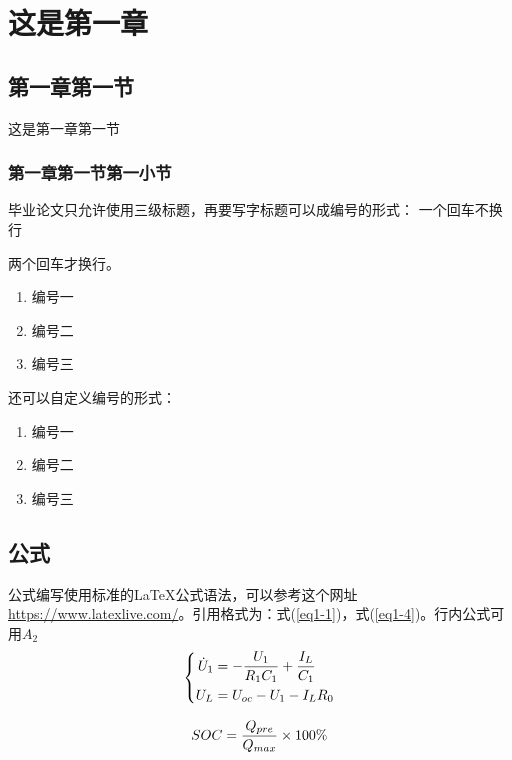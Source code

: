 \chapter{这是第一章}

\section{第一章第一节}
这是第一章第一节

\subsection{第一章第一节第一小节}
毕业论文只允许使用三级标题，再要写字标题可以成编号的形式：
一个回车不换行

两个回车才换行。
\begin{enumerate}
\item 编号一
\item 编号二
\item 编号三
\end{enumerate}
还可以自定义编号的形式：
\begin{enumerate}[自定义1：]
\item 编号一
\item 编号二
\item 编号三
\end{enumerate}
\section{公式}
公式编写使用标准的{\LaTeX}公式语法，可以参考这个网址\url{https://www.latexlive.com/}。引用格式为：式(\ref{eq1-1})，式(\ref{eq1-4})。行内公式可用$A_2$
\begin{equation}
\left \{ \begin{aligned}
\dot U_1 &=  - {{{U_1}} \over {{R_1}{C_1}}} + {{{I_L}} \over {{C_1}}} \\
U_L &= {U_{oc}} - {U_1} - {I_L}{R_0}
\end{aligned}
\right.
\label{eq1-1}
\end{equation}

\begin{equation}
SOC= {Q_{pre} \over Q_{max}}\times 100\% \label{eq1-4}
\end{equation}

